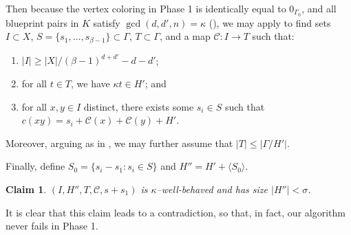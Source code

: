 \documentclass{article}
\newcommand{\cC}{\mathcal{C} }
\newtheorem*{claim*}{Claim}
\theoremstyle{definition}
\begin{document}
Then because the vertex coloring in Phase 1 is identically equal to $0_{\Gamma_0}$, and all blueprint pairs in $K$ satisfy $\gcd(d, d', n)=\kappa$ (), we may apply  to find sets $I\subset X$, $S=\{s_1,\ldots,s_{\beta-1}\}\subset \Gamma$, $T\subset \Gamma$, and a map $\cC:I\to T$ such that: 
    \begin{enumerate}
        \item $|I|\geq |X|/(\beta-1)^{d+d'} - d-d'$;
        \item for all $t\in T$, we have $\kappa t \in H'$; and
        \item for all $x,y\in I$ distinct, there exists some $s_i\in S$ such that $c(xy)=s_i+\cC(x)+\cC(y) + H'$.
    \end{enumerate}
    Moreover, arguing as in , we may further assume that $|T|\leq |\Gamma/H'|$.

Finally, define $S_0=\{s_i-s_1:s_i\in S\}$ and $H''=H' + \langle S_0\rangle$.
\begin{claim*}$(I,H'',T,\cC,s+s_1)$ is $\kappa$--well-behaved and has size $|H''|<\sigma$.
\end{claim*}
It is clear that this claim leads to a contradiction, so that, in fact, our algorithm never fails in Phase 1.
\end{document}
